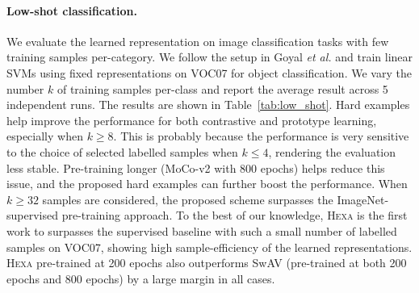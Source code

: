 \documentclass[10pt,twocolumn,letterpaper]{article}
\newcommand{\ea}[0]{\emph{et al. }}
\newcommand{\shortname}{\textsc{Hexa}}
\begin{document}
\paragraph{Low-shot classification.} We evaluate the learned representation on image classification tasks with few training samples per-category. We follow the setup in Goyal \ea\cite{goyal2019scaling} and train linear SVMs using fixed representations on VOC07
for object classification. We vary the number $k$ of training samples per-class and report the average result
across 5 independent runs. The results are shown in Table~\ref{tab:low_shot}. Hard examples help improve the performance for both contrastive and prototype learning, especially when $k \ge 8$. This is probably because the performance is very sensitive to the choice of selected labelled samples when $k \le 4$, rendering the evaluation less stable.  Pre-training longer (MoCo-v2 with 800 epochs) helps reduce this issue, and the proposed hard examples can further boost the performance. When $k\ge32$ samples are considered, the proposed scheme surpasses the ImageNet-supervised pre-training approach. To the best of our knowledge, \shortname{} is the first work to surpasses the supervised baseline with such a small number of labelled samples on VOC07, showing high sample-efficiency of the learned representations. \shortname{} pre-trained at 200 epochs also outperforms SwAV (pre-trained at both 200 epochs and 800 epochs) by a large margin in all cases.
\end{document}
